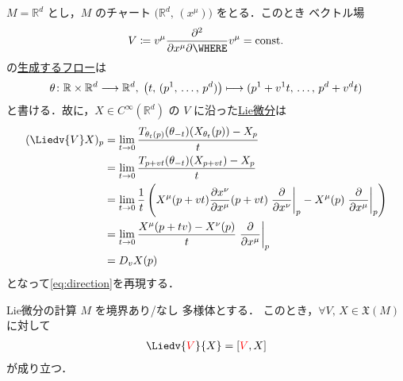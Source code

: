 \documentclass[TQFT_main]{subfiles}
\begin{document}
\begin{myexample}[]{}
    $M = \mathbb{R}^d$ とし，$M$ のチャート $\bigl(\mathbb{R}^d,\, (x^\mu)\bigr)$ をとる．このとき \cinfty ベクトル場
    \begin{align}
        V \coloneqq v^\mu \pdv{}{x^\mu} \WHERE v^\mu = \mathrm{const}.
    \end{align}
    の\hyperref[thm:fundamental-flow]{生成するフロー}は
    \begin{align}
        \theta \colon \mathbb{R} \times \mathbb{R}^d \longrightarrow \mathbb{R}^d,\; \bigl(t,\, (p^1,\, \dots,\, p^d)\bigr) \longmapsto (p^1 + v^1 t,\, \dots,\, p^d + v^d t)
    \end{align}
    と書ける．故に，$X \in C^\infty(\mathbb{R}^d)$ の $V$ に沿った\hyperref[def:Liedv]{Lie微分}は
    \begin{align}
        (\Liedv{V} X)_p 
        &= \lim_{t \to 0} \frac{T_{\theta_t(p)}(\theta_{-t})(X_{\theta_t}(p)) - X_p}{t} \\
        &= \lim_{t \to 0} \frac{T_{p+vt}(\theta_{-t})(X_{p+vt}) - X_p}{t} \\
        &= \lim_{t \to 0} \frac{1}{t} \left( X^\mu (p + vt) \pdv{x^\nu}{x^\mu}()(p+vt) \eval{\pdv{}{x^\nu}}_p - X^\mu(p) \eval{\pdv{}{x^\mu}}_p \right) \\
        &= \lim_{t \to 0} \frac{X^\mu(p+tv) - X^\nu(p)}{t} \eval{\pdv{}{x^\mu}}_p \\
        &= D_v X (p)
    \end{align}
    となって\eqref{eq:direction}を再現する．
\end{myexample}

\begin{mytheo}[label=thm:Liedv]{Lie微分の計算}
    $M$ を境界あり/なし \cinfty 多様体とする．
    このとき，$\forall V,\, X \in \mathfrak{X}(M)$ に対して
    \begin{align}
        \Liedv{\textcolor{red}{V}}{X} = \comm{\textcolor{red}{V}}{X}
    \end{align}
    が成り立つ．
\end{mytheo}
\end{document}

